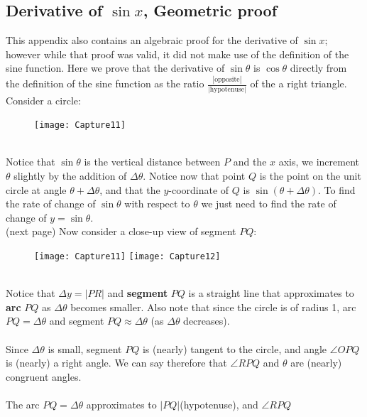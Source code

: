 \documentclass{report}
\begin{document}
\subsection{Derivative of $\sin x$, Geometric proof} %
This appendix also contains an algebraic proof for the derivative of $\sin x$; however while that
proof was valid, it did not make use of the definition of the sine function. Here we prove that
the derivative of $\sin\theta$ is $\cos\theta$ directly from the definition of the sine function 
as the ratio $\frac{|\text{opposite}|}{|\text{hypotenuse}|}$ of the a right triangle.
Consider a circle:
\begin{figure}[h]
\texttt{[image: Capture11]}
\centering\\
\end{figure}\\
Notice that $\sin\theta$ is the vertical distance between $P$ and the $x$ axis,
we increment $\theta$ slightly by the addition of $\Delta\theta$.
Notice now that point $Q$ is the point on the unit 
circle at angle $\theta+\Delta\theta$, and that the $y$-coordinate of $Q$ is
$\sin(\theta+\Delta\theta)$. To find the rate of change of $\sin\theta$ with respect to $\theta$
we just need to find the rate of change of $y=\sin\theta$.\\
(next page)
\newpage
\noindent Now consider a close-up view of segment $PQ$:
\begin{figure}[h]
\texttt{[image: Capture11]}
\texttt{[image: Capture12]}
\centering\\
\end{figure}\\
Notice that $\Delta y=|PR|$ and \textbf{segment} $PQ$ is a straight line that approximates to 
\textbf{arc} $PQ$ as $\Delta\theta$ becomes smaller. Also note that since the circle is of 
radius 1, arc $PQ=\Delta\theta$ and segment
$PQ\approx\Delta\theta$ (as $\Delta\theta$ decreases).\\
\vspace{2mm}\\
Since $\Delta\theta$ is small, segment $PQ$ is (nearly) tangent to the circle, and angle
$\angle OPQ$ is (nearly) a right angle. We can say therefore that $\angle RPQ$ and $\theta$ are
(nearly) congruent angles.\\
\vspace{2mm}\\
The arc $PQ=\Delta\theta$ approximates to $|PQ|$(hypotenuse), and $\angle RPQ$ 
\end{document}
